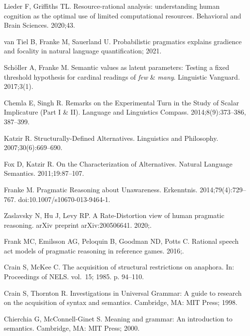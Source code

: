 \documentclass[10pt,letterpaper]{article}
\begin{document}
\begin{thebibliography}{10}
Lieder F, Griffiths TL.
\newblock Resource-rational analysis: understanding human cognition as the
  optimal use of limited computational resources.
\newblock Behavioral and Brain Sciences. 2020;43.

{van Tiel} B, Franke M, Sauerland U.
\newblock Probabilistic pragmatics explains gradience and focality in natural
  language quantification; 2021.

Sch\"{o}ller A, Franke M.
\newblock Semantic values as latent parameters: {T}esting a fixed threshold
  hypothesis for cardinal readings of \emph{few} \& \emph{many}.
\newblock Linguistic Vanguard. 2017;3(1).

Chemla E, Singh R.
\newblock Remarks on the Experimental Turn in the Study of Scalar Implicature
  (Part I \& II).
\newblock Language and Linguistics Compass. 2014;8(9):373--386, 387--399.

Katzir R.
\newblock Structurally-Defined Alternatives.
\newblock Linguistics and Philosophy. 2007;30(6):669--690.

Fox D, Katzir R.
\newblock On the Characterization of Alternatives.
\newblock Natural Language Semantics. 2011;19:87--107.

Franke M.
\newblock Pragmatic Reasoning about Unawareness.
\newblock Erkenntnis. 2014;79(4):729--767.
\newblock doi:{10.1007/s10670-013-9464-1}.

Zaslavsky N, Hu J, Levy RP.
\newblock A Rate-Distortion view of human pragmatic reasoning.
\newblock arXiv preprint arXiv:200506641. 2020;.

Frank MC, Emilsson AG, Peloquin B, Goodman ND, Potts C.
\newblock Rational speech act models of pragmatic reasoning in reference games.
  2016;.

Crain S, McKee C.
\newblock The acquisition of structural restrictions on anaphora.
\newblock In: Proceedings of {NELS}. vol.~15; 1985. p. 94--110.

Crain S, Thornton R.
\newblock Investigations in {U}niversal {G}rammar: A guide to research on the
  acquisition of syntax and semantics.
\newblock Cambridge, MA: MIT Press; 1998.

Chierchia G, McConnell-Ginet S.
\newblock Meaning and grammar: An introduction to semantics.
\newblock Cambridge, MA: MIT Press; 2000.


\end{thebibliography}
\end{document}
